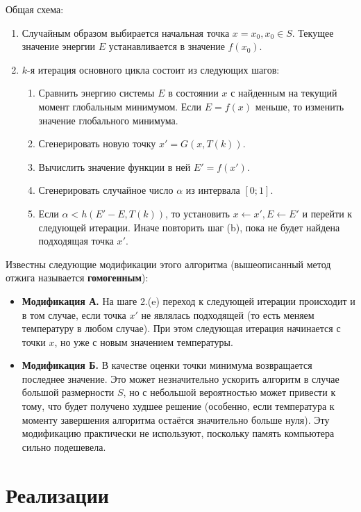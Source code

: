 \noindent Общая схема: \\
\begin{enumerate}
    \item Случайным образом выбирается начальная точка $x = x_0, x_0 \in S$. Текущее значение энергии $E$ устанавливается в значение $f(x_0)$.
    \item $k$-я итерация основного цикла состоит из следующих шагов:
    \begin{enumerate}
        \item Сравнить энергию системы $E$ в состоянии $x$ с найденным на текущий момент глобальным минимумом. Если $E = f(x)$ меньше, то изменить значение глобального минимума.
        \item Сгенерировать новую точку $x' = G(x, T(k))$.
        \item Вычислить значение функции в ней $E' = f(x')$.
        \item Сгенерировать случайное число $\alpha$ из интервала $[0; 1]$.
        \item Если $\alpha < h(E' - E, T(k))$, то установить $x \leftarrow x', E \leftarrow E'$ и перейти к следующей итерации. Иначе повторить шаг (b), пока не будет найдена подходящая точка $x'$.
    \end{enumerate}
\end{enumerate}

Известны следующие модификации этого алгоритма (вышеописанный метод отжига называется \textbf{гомогенным}):

\begin{itemize}
    \item \textbf{Модификация А.} На шаге 2.(e) переход к следующей итерации происходит и в том случае, если точка $x'$ не являлась подходящей (то есть меняем температуру в любом случае). При этом следующая итерация начинается с точки $x$, но уже с новым значением температуры.
    
    \item \textbf{Модификация Б.} В качестве оценки точки минимума возвращается последнее значение. Это может незначительно ускорить алгоритм в случае большой размерности $S$, но с небольшой вероятностью может привести к тому, что будет получено худшее решение (особенно, если температура к моменту завершения алгоритма остаётся значительно больше нуля). Эту модификацию практически не используют, поскольку память компьютера сильно подешевела.
\end{itemize}
\section{Реализации}
